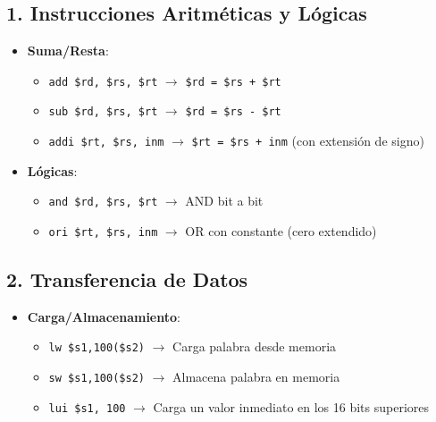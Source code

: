 \documentclass{article}
\begin{document}
\subsection*{1. Instrucciones Aritméticas y Lógicas}
\begin{itemize}
    \item \textbf{Suma/Resta}:
    \begin{itemize}
        \item \verb|add $rd, $rs, $rt| $\rightarrow$ \verb|$rd = $rs + $rt|
        \item \verb|sub $rd, $rs, $rt| $\rightarrow$ \verb|$rd = $rs - $rt|
        \item \verb|addi $rt, $rs, inm| $\rightarrow$ \verb|$rt = $rs + inm| (con extensión de signo)
    \end{itemize}
    
    \item \textbf{Lógicas}:
    \begin{itemize}
        \item \verb|and $rd, $rs, $rt| $\rightarrow$ AND bit a bit
        \item \verb|ori $rt, $rs, inm| $\rightarrow$ OR con constante (cero extendido)
    \end{itemize}
\end{itemize}

\subsection*{2. Transferencia de Datos}
\begin{itemize}
    \item \textbf{Carga/Almacenamiento}:
    \begin{itemize}
        \item \verb|lw $s1,100($s2)| $\rightarrow$ Carga palabra desde memoria
        \item \verb|sw $s1,100($s2)| $\rightarrow$ Almacena palabra en memoria
        \item \verb|lui $s1, 100| $\rightarrow$ Carga un valor inmediato en los 16 bits superiores
    \end{itemize}
\end{itemize}
\end{document}

